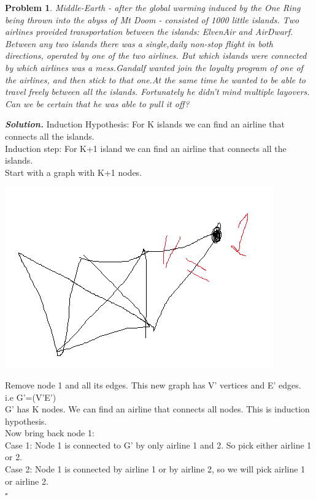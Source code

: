 \documentclass[12pt]{article}
\newtheorem{problem}{Problem}
\newenvironment{solution}[1][\it{Solution}]{\textbf{#1. } }{$\square$}
\begin{document}
\begin{problem}
Middle-Earth  -  after  the  global  warming  induced  by  the  One  Ring  being  thrown  into  the abyss  of  Mt  Doom  -  consisted  of  1000  little  islands.   Two  airlines  provided  transportation between the islands:  ElvenAir and AirDwarf.  Between any two islands there was a single,daily non-stop flight in both directions, operated by one of the two airlines.  But which islands were connected by which airlines was a mess.Gandalf wanted join the loyalty program of one of the airlines, and then stick to that one.At the same time he wanted to be able to travel freely between all the islands.  Fortunately he didn’t mind multiple layovers.  Can we be certain that he was able to pull it off?
\end{problem}

\begin{solution}
Induction Hypothesis: For K islands we can find an airline that connects all the islands.\\
Induction step: For K+1 island we can find an airline that connects all the islands.\\
Start with a graph with K+1 nodes.

\begin{center}
\includegraphics[scale=0.75]{WS_1_3}    
\end{center}

Remove node 1 and all its edges. This new graph has V’ vertices and E’ edges.\\
i.e G’=(V’E’)\\
G’ has K nodes. We can find an airline that connects all nodes. This is induction hypothesis.\\
Now bring back node 1:\\
Case 1: Node 1 is connected to G’ by only airline 1 and 2. So pick either airline 1 or 2.\\
Case 2: Node 1 is connected by airline 1 or by airline 2, so we will pick airline 1 or airline 2.\\

\end{solution}
\end{document}
